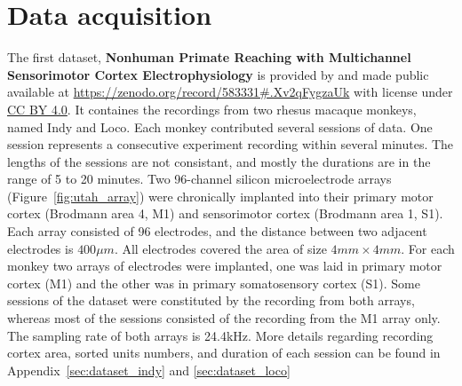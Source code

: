 
\section{Data acquisition}

The first dataset, \textbf{Nonhuman Primate Reaching with Multichannel Sensorimotor Cortex Electrophysiology} is provided by \cite{makin2018} and made public available at \url{https://zenodo.org/record/583331#.Xv2qFygzaUk} with license under \href{https://creativecommons.org/licenses/by/4.0/legalcode}{CC BY 4.0}.
It containes the recordings from two rhesus macaque monkeys, named Indy and Loco.
Each monkey contributed several sessions of data.
One session represents a consecutive experiment recording within several minutes.
The lengths of the sessions are not consistant, and mostly the durations are in the range of 5 to 20 minutes.
Two 96-channel silicon microelectrode arrays (Figure~\ref{fig:utah_array}) were chronically implanted into their primary motor cortex (Brodmann area 4, M1) and sensorimotor cortex (Brodmann area 1, S1).
Each array consisted of 96 electrodes, and the distance between two adjacent electrodes is $400 \mu m$. 
All electrodes covered the area of size $4mm \times 4mm$.
For each monkey two arrays of electrodes were implanted, 
one was laid in primary motor cortex (M1) and the other was in primary somatosensory cortex (S1).
Some sessions of the dataset were constituted by the recording from both arrays, 
whereas most of the sessions consisted of the recording from the M1 array only.
The sampling rate of both arrays is 24.4kHz. 
More details regarding recording cortex area,
sorted units numbers, 
and duration of each session can be found in Appendix~\ref{sec:dataset_indy} and \ref{sec:dataset_loco}

